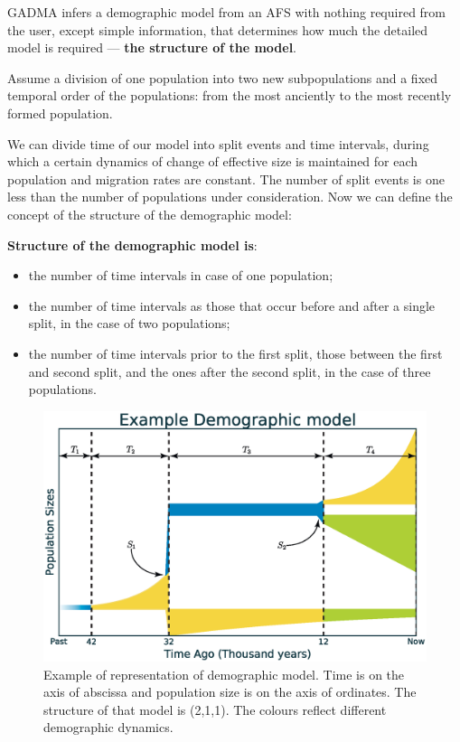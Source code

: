 \documentclass[12pt]{article}
\begin{document}
GADMA infers a demographic model from an AFS with nothing required from the user, except simple information, that determines how much the detailed model is required --- \textbf{the structure of the model}.

Assume a division of one population into two new subpopulations and a fixed temporal order of the populations: from the most anciently to the most recently formed population. 

We can divide time of our model into split events and time intervals, during which a certain dynamics of change of effective size is maintained for each population and migration rates are constant. The number of split events is one less than the number of populations under consideration. Now we can define the concept of the structure of the demographic model:

\textbf{Structure of the demographic model is}:
\begin{itemize}
    \item the number of time intervals in case of one population;
    \item the number of time intervals as those that occur before and after a single split, in the case of  two populations;
    \item the number of time intervals prior to the first split, those between the first and second split, and the ones after the second split, in the case of three populations.
\end{itemize} 

\begin{figure}[b!]
  \centering
  \includegraphics[width=0.7\linewidth]{dem_model_col.eps}
  \caption{Example of representation of demographic model. Time is on the axis of abscissa and population size is on the axis of ordinates. The structure of that model is (2,1,1). The colours reflect different demographic dynamics.}
  \label{fig:exaple_of_model_plot}
\end{figure}
\end{document}
